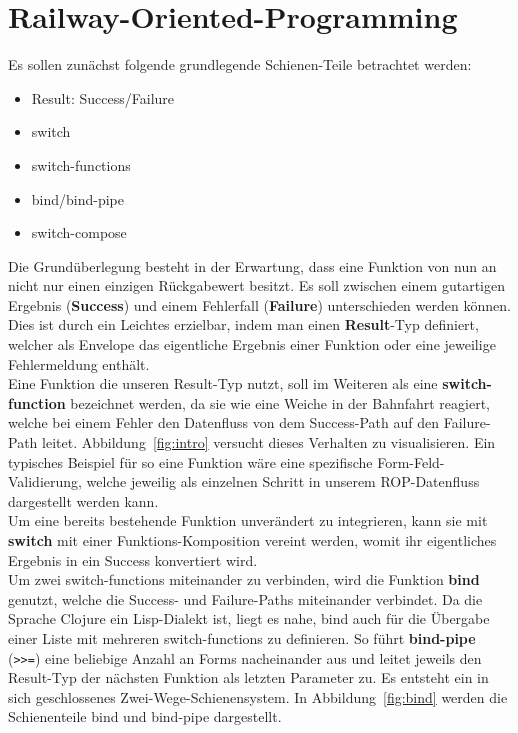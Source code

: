 \documentclass[10pt,journal,compsoc]{IEEEtran}
\begin{document}
  \section{Railway-Oriented-Programming}
  Es sollen zunächst folgende grundlegende Schienen-Teile betrachtet werden:
  \begin{itemize}
    \item Result: Success/Failure
    \item switch
    \item switch-functions
    \item bind/bind-pipe
    \item switch-compose
  \end{itemize}
  Die Grundüberlegung besteht in der Erwartung, dass eine Funktion von nun an nicht nur einen einzigen Rückgabewert besitzt.
  Es soll zwischen einem gutartigen Ergebnis (\textbf{Success}) und einem Fehlerfall (\textbf{Failure}) unterschieden werden können.
  Dies ist durch ein Leichtes erzielbar, indem man einen \textbf{Result}-Typ definiert, welcher als Envelope das eigentliche Ergebnis einer Funktion oder eine jeweilige Fehlermeldung enthält.\\
  Eine Funktion die unseren Result-Typ nutzt, soll im Weiteren als eine \textbf{switch-function} bezeichnet werden, da sie wie eine Weiche in der Bahnfahrt reagiert, welche bei einem Fehler den Datenfluss von dem Success-Path auf den Failure-Path leitet.
  Abbildung~\ref{fig:intro} versucht dieses Verhalten zu visualisieren.
  Ein typisches Beispiel für so eine Funktion wäre eine spezifische Form-Feld-Validierung, welche jeweilig als einzelnen Schritt in unserem ROP-Datenfluss dargestellt werden kann.\\
  Um eine bereits bestehende Funktion unverändert zu integrieren, kann sie mit \textbf{switch} mit einer Funktions-Komposition vereint werden, womit ihr eigentliches Ergebnis in ein Success konvertiert wird.\\
  Um zwei switch-functions miteinander zu verbinden, wird die Funktion \textbf{bind} genutzt, welche die Success- und Failure-Paths miteinander verbindet.
  Da die Sprache Clojure ein Lisp-Dialekt ist, liegt es nahe, bind auch für die Übergabe einer Liste mit mehreren switch-functions zu definieren.
  So führt \textbf{bind-pipe} (\texttt{>>=}) eine beliebige Anzahl an Forms nacheinander aus und leitet jeweils den Result-Typ der nächsten Funktion als letzten Parameter zu.
  Es entsteht ein in sich geschlossenes Zwei-Wege-Schienensystem.
  In Abbildung~\ref{fig:bind} werden die Schienenteile bind und bind-pipe dargestellt.
\end{document}
